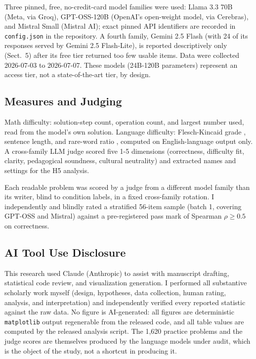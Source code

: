 \documentclass[runningheads]{llncs}
\begin{document}
Three pinned, free, no-credit-card model families were used: Llama 3.3 70B (Meta, via Groq), GPT-OSS-120B (OpenAI's open-weight model, via Cerebras), and Mistral Small (Mistral AI); exact pinned API identifiers are recorded in \texttt{config.json} in the repository. A fourth family, Gemini 2.5 Flash (with 24 of its responses served by Gemini 2.5 Flash-Lite), is reported descriptively only (Sect.~5) after its free tier returned too few usable items. Data were collected 2026-07-03 to 2026-07-07. These models (24B-120B parameters) represent an access tier, not a state-of-the-art tier, by design.

\subsection{Measures and Judging}

Math difficulty: solution-step count, operation count, and largest number used, read from the model's own solution. Language difficulty: Flesch-Kincaid grade \cite{kincaid1975}, sentence length, and rare-word ratio \cite{speer2022}, computed on English-language output only. A cross-family LLM judge scored five 1-5 dimensions (correctness, difficulty fit, clarity, pedagogical soundness, cultural neutrality) and extracted names and settings for the H5 analysis.

Each readable problem was scored by a judge from a different model family than its writer, blind to condition labels, in a fixed cross-family rotation. I independently and blindly rated a stratified 56-item sample (batch 1, covering GPT-OSS and Mistral) against a pre-registered pass mark of Spearman $\rho \geq 0.5$ on correctness.

\subsection{AI Tool Use Disclosure}

This research used Claude (Anthropic) to assist with manuscript drafting, statistical code review, and visualization generation. I performed all substantive scholarly work myself (design, hypotheses, data collection, human rating, analysis, and interpretation) and independently verified every reported statistic against the raw data. No figure is AI-generated: all figures are deterministic \texttt{matplotlib} output regenerable from the released code, and all table values are computed by the released analysis script. The 1,620 practice problems and the judge scores are themselves produced by the language models under audit, which is the object of the study, not a shortcut in producing it.
\end{document}
